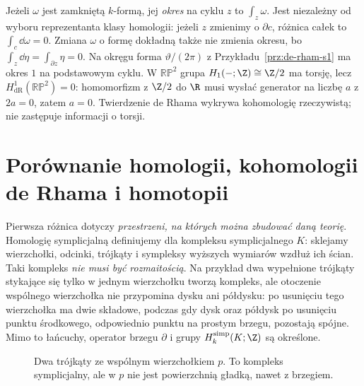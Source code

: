 \begin{przyklad}
Jeżeli $\omega$ jest zamkniętą $k$-formą, jej
\emph{okres} na cyklu $z$ to $\int_z\omega$.
Jest niezależny od wyboru reprezentanta klasy
homologii: jeżeli $z$ zmienimy o $\partial c$,
różnica całek to $\int_c\dd\omega=0$.
Zmiana $\omega$ o formę dokładną także nie zmienia
okresu, bo $\int_z\dd\eta=\int_{\partial z}\eta=0$.
Na okręgu forma $\vartheta/(2\pi)$ z
Przykładu~\ref{prz:de-rham-s1} ma okres $1$ na
podstawowym cyklu. W $\mathbb{RP}^2$ grupa
$H_1(-;\Z)\cong\Z/2$ ma torsję, lecz
$H^1_{\mathrm{dR}}(\mathbb{RP}^2)=0$:
homomorfizm z $\Z/2$ do $\R$ musi wysłać
generator na liczbę $a$ z $2a=0$, zatem $a=0$.
Twierdzenie de Rhama wykrywa kohomologię
rzeczywistą; nie zastępuje informacji o torsji.
\end{przyklad}

\section{Porównanie homologii, kohomologii de Rhama i homotopii}
\label{sec:porownanie-trzech-teorii}

Pierwsza różnica dotyczy \emph{przestrzeni, na których
można zbudować daną teorię}. Homologię symplicjalną
definiujemy dla kompleksu symplicjalnego $K$:
sklejamy wierzchołki, odcinki, trójkąty i sympleksy
wyższych wymiarów wzdłuż ich ścian. Taki kompleks
\emph{nie musi być rozmaitością}. Na przykład dwa
wypełnione trójkąty stykające się tylko w jednym
wierzchołku tworzą kompleks, ale otoczenie
wspólnego wierzchołka nie przypomina dysku
ani półdysku: po usunięciu tego wierzchołka ma dwie
składowe, podczas gdy dysk oraz półdysk po usunięciu
punktu środkowego, odpowiednio punktu na prostym brzegu,
pozostają spójne. Mimo to łańcuchy, operator brzegu
$\partial$ i grupy $H_k^{\mathrm{simp}}(K;\Z)$
są określone.

\begin{figure}[!htbp]
\centering
{}
\caption{Dwa trójkąty ze wspólnym wierzchołkiem $p$.
To kompleks symplicjalny, ale w $p$ nie jest
powierzchnią gładką, nawet z brzegiem.}
\label{fig:kompleks-nie-rozmaitosc}
\end{figure}

